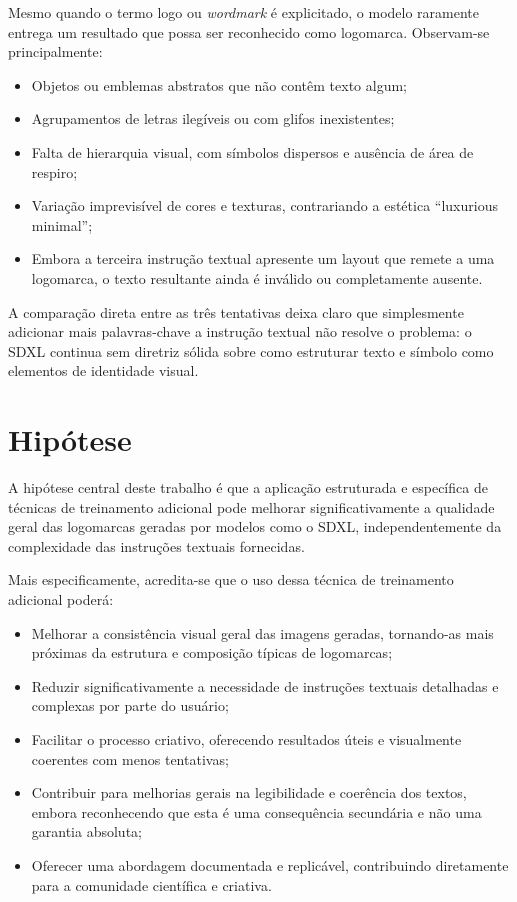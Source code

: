 \documentclass[12pt, %
openright, 
oneside, %
a4paper,    %
brazil]{facom-ufu-abntex2}
\begin{document}
Mesmo quando o termo logo ou \emph{wordmark} é explicitado, o modelo raramente entrega um resultado que possa ser reconhecido como logomarca. Observam-se principalmente:

\begin{itemize}
    \item Objetos ou emblemas abstratos que não contêm texto algum;
    \item Agrupamentos de letras ilegíveis ou com glifos inexistentes;
    \item Falta de hierarquia visual, com símbolos dispersos e ausência de área de respiro;
    \item Variação imprevisível de cores e texturas, contrariando a estética ``luxurious minimal'';
    \item Embora a terceira instrução textual apresente um layout que remete a uma logomarca, o texto resultante ainda é inválido ou completamente ausente.
\end{itemize}

A comparação direta entre as três tentativas deixa claro que simplesmente adicionar mais palavras-chave a instrução textual não resolve o problema: o SDXL continua sem diretriz sólida sobre como estruturar texto e símbolo como elementos de identidade visual.

\section{Hipótese}

A hipótese central deste trabalho é que a aplicação estruturada e específica de técnicas de treinamento adicional pode melhorar significativamente a qualidade geral das logomarcas geradas por modelos como o SDXL, independentemente da complexidade das instruções textuais fornecidas.

Mais especificamente, acredita-se que o uso dessa técnica de treinamento adicional poderá:

\begin{itemize}
    \item Melhorar a consistência visual geral das imagens geradas, tornando-as mais próximas da estrutura e composição típicas de logomarcas;
    \item Reduzir significativamente a necessidade de instruções textuais detalhadas e complexas por parte do usuário;
    \item Facilitar o processo criativo, oferecendo resultados úteis e visualmente coerentes com menos tentativas;
    \item Contribuir para melhorias gerais na legibilidade e coerência dos textos, embora reconhecendo que esta é uma consequência secundária e não uma garantia absoluta;
    \item Oferecer uma abordagem documentada e replicável, contribuindo diretamente para a comunidade científica e criativa.
\end{itemize}
\end{document}
